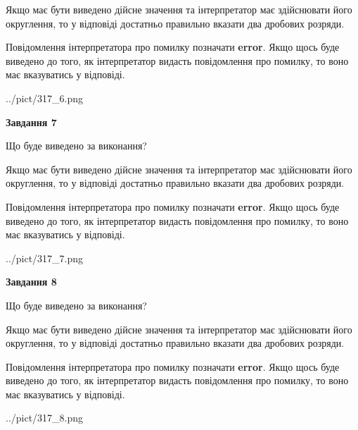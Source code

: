\documentclass[12pt, ukrainian]{article}
\begin{document}
{\begin {Large}
Якщо має бути виведено дійсне значення та інтерпретатор має здійснювати його округлення, 
то у відповіді достатньо правильно вказати два дробових розряди.

Повідомлення інтерпретатора про помилку позначати \textbf{error}.
Якщо щось буде виведено до того, як інтерпретатор видасть повідомлення про помилку, 
то воно має вказуватись у відповіді. \par

\begin{center}
	{../pict/317_6.png}
\end{center}
\newpage

{\begin {center}\textbf{Завдання 7}\end {center}}\par
Що буде виведено за виконання? \par

Якщо має бути виведено дійсне значення та інтерпретатор має здійснювати його округлення, 
то у відповіді достатньо правильно вказати два дробових розряди.

Повідомлення інтерпретатора про помилку позначати \textbf{error}.
Якщо щось буде виведено до того, як інтерпретатор видасть повідомлення про помилку, 
то воно має вказуватись у відповіді. \par

\begin{center}
	{../pict/317_7.png}
\end{center}
\newpage

{\begin {center}\textbf{Завдання 8}\end {center}}\par
Що буде виведено за виконання? \par

Якщо має бути виведено дійсне значення та інтерпретатор має здійснювати його округлення, 
то у відповіді достатньо правильно вказати два дробових розряди.

Повідомлення інтерпретатора про помилку позначати \textbf{error}.
Якщо щось буде виведено до того, як інтерпретатор видасть повідомлення про помилку, 
то воно має вказуватись у відповіді. \par

\begin{center}
	{../pict/317_8.png}
\end{center}
\newpage


\end{Large}}
\end{document}
